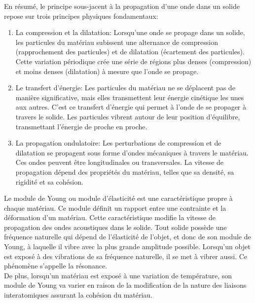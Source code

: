 En résumé, le principe sous-jacent à la propagation 
d'une onde dans un solide repose sur trois principes physiques fondamentaux:
\begin{enumerate}
    \item La compression et la dilatation:
    \subitem Lorsqu'une onde se propage dans un solide, 
    les particules du matériau subissent une alternance de 
    compression (rapprochement des particules) 
    et de dilatation (écartement des particules). 
    Cette variation périodique crée une série de régions plus denses 
    (compression) et moins denses (dilatation) à mesure que l'onde se 
    propage.
    \item Le transfert d'énergie:
    \subitem  Les particules du matériau ne se déplacent pas de manière 
    significative, mais elles transmettent leur énergie cinétique les unes 
    aux autres. C'est ce transfert d'énergie qui permet à l'onde de 
    se propager à travers le solide. Les particules vibrent autour de leur 
    position d'équilibre, transmettant l'énergie de proche en proche.
    \item La propagation ondulatoire:
    \subitem Les perturbations de compression et de dilatation se propagent 
    sous forme d'ondes mécaniques à travers le matériau. Ces ondes peuvent 
    être longitudinales ou transversales. La vitesse de 
    propagation dépend des propriétés du matériau, telles que sa densité, 
    sa rigidité et sa cohésion.\\
\end{enumerate}

Le module de Young ou module d'élasticité est une caractéristique propre à
chaque matériau. Ce module définit un rapport entre une contrainte et la
déformation d'un matériau. Cette caractéristique modifie la vitesse de
propagation des ondes acoustiques dans le solide.
Tout solide possède une fréquence naturelle qui dépend de l'élasticité de
l'objet, et donc de son module de Young, à laquelle il vibre avec la plus
grande amplitude possible. Lorsqu'un objet est exposé à des vibrations de
sa fréquence naturelle, il se met à vibrer aussi. Ce phénomène s'appelle
la résonance.~\cite{professeur-khattabi}\\


De plus, lorsqu'un matériau est exposé à une variation de température, son
module de Young va varier en raison de la modification de la nature des
liaisons interatomiques assurant la cohésion du matériau.

